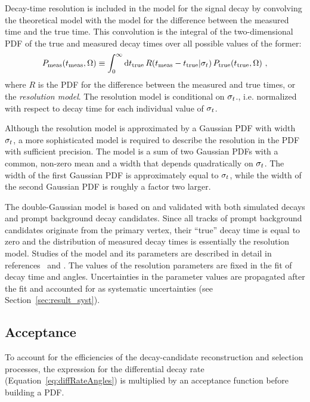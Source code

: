 Decay-time resolution is included in the model for the signal decay by convolving the theoretical model with the model for the difference
between the measured time and the true time. This convolution is the integral of the two-dimensional PDF of the true and measured decay
times over all possible values of the former:
\begin{equation}
  P_\text{meas}(t_\text{meas}, \Omega)
    \equiv \int_0^\infty \ud t_\text{true}\, R(t_\text{meas} - t_\text{true}|\sigmat)\, P_\text{true}(t_\text{true}, \Omega)\ ,
\end{equation}
where $R$ is the PDF for the difference between the measured and true times, or the \emph{resolution model}. The resolution model is
conditional on $\sigma_t$., i.e. normalized with respect to decay time for each individual value of $\sigma_t$.

Although the resolution model is approximated by a Gaussian PDF with width $\sigma_t$, a more sophisticated model is required to describe
the resolution in the PDF with sufficient precision. The model is a sum of two Gaussian PDFs with a common, non-zero mean and a width that
depends quadratically on $\sigma_t$. The width of the first Gaussian PDF is approximately equal to $\sigma_t$, while the width of the second
Gaussian PDF is roughly a factor two larger.

The double-Gaussian model is based on and validated with both simulated \BstoJpsiKK{} decays and prompt background decay candidates. Since
all tracks of prompt background candidates originate from the primary vertex, their ``true'' decay time is equal to zero and the
distribution of measured decay times is essentially the resolution model. Studies of the model and its parameters are described in detail
in references~\cite{Aaij:2015} and \cite{LHCb-ANA-2014-039}. The values of the resolution parameters are fixed in the fit of decay time and
angles. Uncertainties in the parameter values are propagated after the fit and accounted for as systematic uncertainties (see
Section~\ref{sec:result_syst}).


\subsection{Acceptance}
\label{subsec:ana_time_acc}

To account for the efficiencies of the decay-candidate reconstruction and selection processes, the expression for the differential decay
rate (Equation~\ref{eq:diffRateAngles}) is multiplied by an acceptance function before building a PDF.

